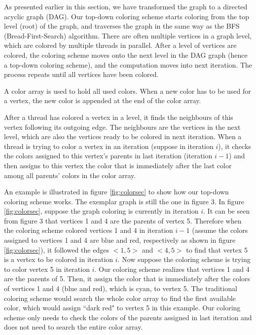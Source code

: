 As presented earlier in this section, we have transformed the graph to a directed acyclic graph (DAG). Our top-down coloring scheme starts coloring from the top level  (root) of the graph, and traverses the graph in the same way as the BFS (Bread-First-Search) algorithm. There are often multiple vertices in a graph level, which are colored by multiple threads in parallel. After a level of vertices are colored, the coloring scheme moves onto the next level in the DAG graph (hence a top-down coloring scheme), and the computation moves into next iteration. The process repeats until all vertices have been colored. 

A color array is used to hold all used colors. When a new color has to be used for a vertex, the new color is appended at the end of the color array. 

After a thread has colored a vertex in a level, it finds the neighbours of this vertex following its outgoing edge. The neighbours are the vertices in the next level, which are also the vertices ready to be colored in next iteration. When a thread is trying to color a vertex in an iteration (suppose in iteration $i$), it checks the colors assigned to this vertex's parents in last iteration (iteration $i-1$) and then assigns to this vertex the color that is immediately after the last color among all parents' colors in the color array. 

An example is illustrated in figure \ref{fig:colorsec} to show how our top-down coloring scheme works. The exemplar graph is still the one in figure 3. In figure \ref{fig:colorsec}, suppose the graph coloring is currently in iteration $i$. It can be seen from figure 3 that vertices 1 and 4 are the parents of vertex 5. Therefore when the coloring scheme colored vertices 1 and 4 in iteration $i-1$ (assume the colors assigned to vertices 1 and 4 are blue and red, respectively as shown in figure \ref{fig:colorsec}), it followed the edges $<1, 5>$ and $<4, 5>$ to find that vertex 5 is a vertex to be colored in iteration $i$. Now suppose the coloring scheme is trying to color  vertex 5 in iteration $i$. Our coloring scheme realizes that vertices 1 and 4 are the parents of 5. Then, it assign the color that is immediately after the colors of vertices 1 and 4 (blue and red), which is cyan, to vertex 5. The traditional coloring scheme would search the whole color array to find the first available color, which would assign ``dark red" to vertex 5 in this example. Our coloring scheme only needs to check the colors of the parents assigned in last iteration and does not need to search the entire color array. 

